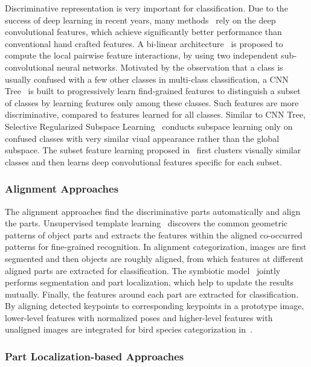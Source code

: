 \documentclass[journal]{IEEEtran}
\begin{document}
Discriminative representation is very important for classification. Due to the success of deep learning in recent years, many methods~\cite{alexnet, decaf, Simonyan:2014ws} rely on the deep convolutional features, which achieve significantly better performance than conventional hand crafted features. A bi-linear architecture~\cite{bilinear} is proposed to compute the local pairwise feature interactions, by using two independent sub-convolutional neural networks. Motivated by the observation that a class is usually confused with a few other classes in multi-class classification, a CNN Tree~\cite{Wang:2015vo} is built to progressively learn find-grained features to distinguish a subset of classes by learning features only among these classes. Such features are more discriminative, compared to features learned for all classes. Similar to CNN Tree, Selective Regularized Subspace Learning~\cite{tmm06} conducts subspace learning only on confused classes with very similar viual appearance rather than the global subspace. The subset feature learning proposed in~\cite{Ge:2015tr} first clusters visually similar classes and then learns deep convolutional features specific for each subset.

\subsubsection{Alignment Approaches}

The alignment approaches find the discriminative parts automatically and align the parts. Unsupervised template learning~\cite{template} discovers the common geometric patterns of object parts and extracts the features within the aligned co-occurred patterns for fine-grained recognition. In alignment categorization\cite{alignment,Chai11}, images are first segmented and then objects are roughly aligned, from which features at different aligned parts are extracted for classification. The symbiotic model~\cite{symbiotic_segmentation} jointly performs segmentation and part localization, which help to update the results mutually. Finally, the features around each part are extracted for classification. By aligning detected keypoints to corresponding keypoints in a prototype image, lower-level features with normalized poses and higher-level features with unaligned images are integrated for bird species categorization in~\cite{improved_pose_normalized}.

\subsubsection{Part Localization-based Approaches}
\end{document}
